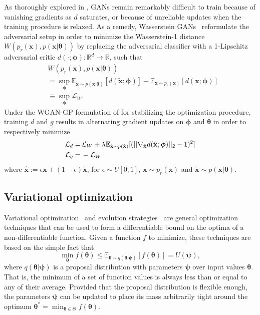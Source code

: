 \documentclass[twocolumn,superscriptaddress,aps]{revtex4-1}
\newcommand{\bftheta}{{\bm \theta}}
\newcommand{\bfpsi}{{\bm \psi}}
\newcommand{\bfphi}{{\bm \phi}}
\theoremstyle{plain}
\begin{document}
As thoroughly explored in \citep{2017arXiv170104862A}, GANs remain remarkably
difficult to train because of vanishing gradients as $d$ saturates, or because of
unreliable updates when the training procedure is relaxed. As a remedy,
Wasserstein GANs~\citep{2017arXiv170107875A} reformulate the adversarial
setup in order to minimize the Wasserstein-1 distance $W( p_r(\mathbf{x} ), p(\mathbf{x} | \bftheta)  )$
by replacing the adversarial classifier with a 1-Lipschitz adversarial critic
$d(\cdot; \bfphi) : \mathbb{R}^d \to \mathbb{R}$, such that
\begin{align}
& W( p_r(\mathbf{x} ), p(\mathbf{x} | \bftheta)  ) \nonumber \\
&= \sup_{\bfphi}  \mathbb{E}_{\tilde{\mathbf{x}}\sim p(\mathbf{x}|\bftheta)} [d(\tilde{\mathbf{x}}; \bfphi)] - \mathbb{E}_{\mathbf{x} \sim p_r(\mathbf{x})} [d(\mathbf{x}; \bfphi)] \nonumber \\
&\equiv \sup_{\bfphi} \mathcal{L}_W.
\end{align}
Under the WGAN-GP formulation of \cite{2017arXiv170400028G}
for stabilizing the optimization procedure,
training $d$ and $g$ results in alternating gradient updates on $\bfphi$ and $\bftheta$ in order to respectively minimize
\begin{align}
    {\cal L}_d =\,&  \mathcal{L}_W + \lambda \mathbb{E}_{\hat{\mathbf{x}} \sim p({\hat{\mathbf{x}})}} [(|| \nabla_{\hat{\mathbf{x}}} d({\hat{\mathbf{x}}};\bfphi) ||_2 - 1)^2] \\
    {\cal L}_g =\,& - \mathcal{L}_W
\end{align}
where ${\hat{\mathbf{x}}} := \epsilon \mathbf{x} +
(1-\epsilon)\tilde{\mathbf{x}}$, for $\epsilon \sim U[0,1]$, $\mathbf{x} \sim
p_r(\mathbf{x})$ and $\tilde{\mathbf{x}} \sim p(\mathbf{x}|\bftheta)$.


\subsection{Variational optimization}

Variational optimization~\cite{2012arXiv1212.4507S,staines2013optimization} and evolution strategies~\citep{2011arXiv1106.4487W} are general
optimization techniques that can be used to form a differentiable bound
on the optima of a non-differentiable function. Given a function $f$ to minimize,
these techniques are based on the simple fact that
\begin{equation}
    \min_{\bftheta} f(\bftheta) \leq \mathbb{E}_{\bftheta \sim q(\bftheta|\bfpsi)} [f(\bftheta)] = U(\bfpsi),
\end{equation}
where $q(\bftheta|\bfpsi)$ is a proposal distribution with parameters $\bfpsi$ over input values $\bftheta$.
That is, the minimum of a set of function values is always less than or equal
to any of their average. Provided that the proposal distribution is flexible enough, the parameters $\bfpsi$
can be updated to place its mass arbitrarily tight around the optimum $\bftheta^* = \min_{\bftheta \in \Theta} f(\bftheta)$.
\end{document}
